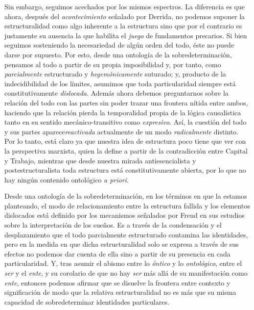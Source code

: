 Sin embargo, seguimos acechados por los mismos espectros. La diferencia
es que ahora, después del \emph{acontecimiento} señalado por Derrida, no
podemos suponer la estructuralidad como algo inherente a la estructura
sino que por el contrario es justamente su ausencia la que habilita el
\emph{juego} de fundamentos precarios. Si bien seguimos sosteniendo la
necesariedad de algún orden del todo, éste no puede darse por supuesto.
Por esto, desde una ontología de la sobredeterminación, pensamos al todo
a partir de su propia imposibilidad y, por tanto, como
\emph{parcialmente} estructurado y \emph{hegemónicamente} suturado; y,
producto de la indecidibilidad de los límites, asumimos que toda
particularidad siempre está constitutivamente \emph{dislocada}. Además
ahora debemos preguntarnos sobre la relación del todo con las partes sin
poder trazar una frontera nítida entre ambos, haciendo que la relación
pierda la temporalidad propia de la lógica causalística tanto en su
sentido mecánico-transitivo como \emph{expresivo}. Así, la cuestión del
todo y sus partes aparece\emph{reactivada} actualmente de un modo
\emph{radicalmente} distinto. Por lo tanto, está claro ya que nuestra
idea de estructura poco tiene que ver con la perspectiva marxista, quien
la define a partir de la contradicción entre Capital y Trabajo, mientras
que desde nuestra mirada antiesencialista y postestructuralista toda
estructura está constitutivamente abierta, por lo que no hay ningún
contenido ontológico \emph{a priori}.

Desde una ontología de la sobredeterminación, en los términos en que la
estamos planteando, el modo de relacionamiento entre la estructura
fallida y los elementos dislocados está definido por los mecanismos
señalados por Freud en sus estudios sobre la interpretación de los
sueños. Es a través de la condensación y el desplazamiento que el todo
parcialmente estructurado contamina las identidades, pero en la medida
en que dicha estructuralidad solo se expresa a través de sus efectos no
podemos dar cuenta de ella sino a partir de su presencia en cada
particularidad. Y, tras asumir el abismo entre lo \emph{óntico} y lo
\emph{ontológico}, entre el \emph{ser} y el \emph{ente}, y su corolario
de que no hay \emph{ser} más allá de su manifestación como \emph{ente},
entonces podemos afirmar que se disuelve la frontera entre contexto y
significación de modo que la relativa estructuralidad no es más que su
misma capacidad de sobredeterminar identidades particulares.

